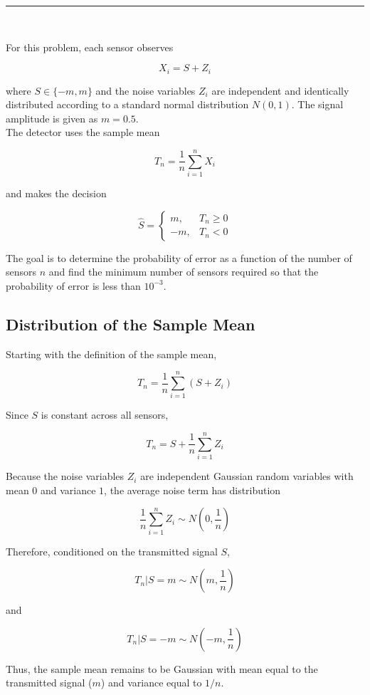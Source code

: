 \documentclass[12pt,a4paper]{article}
\begin{document}
\hrule

\

For this problem, each sensor observes

\[
X_i = S + Z_i
\]

where \(S \in \{-m,m\}\) and the noise variables \(Z_i\) are independent and identically distributed according to a standard normal distribution \(N(0,1)\). The signal amplitude is given as \(m = 0.5\). \\

The detector uses the sample mean

\[
T_n = \frac{1}{n}\sum_{i=1}^{n} X_i
\]

and makes the decision

\[
\hat{S} =
\begin{cases}
m, & T_n \ge 0 \\
-m, & T_n < 0
\end{cases}
\]

The goal is to determine the probability of error as a function of the number of sensors \(n\) and find the minimum number of sensors required so that the probability of error is less than \(10^{-3}\).

\subsection{Distribution of the Sample Mean}

Starting with the definition of the sample mean,

\[
T_n = \frac{1}{n}\sum_{i=1}^{n}(S+Z_i)
\]

Since \(S\) is constant across all sensors,

\[
T_n = S + \frac{1}{n}\sum_{i=1}^{n} Z_i
\]

Because the noise variables \(Z_i\) are independent Gaussian random variables with mean \(0\) and variance \(1\), the average noise term has distribution

\[
\frac{1}{n}\sum_{i=1}^{n} Z_i \sim N\left(0,\frac{1}{n}\right)
\]

Therefore, conditioned on the transmitted signal \(S\),

\[
T_n|S=m \sim N\left(m,\frac{1}{n}\right)
\]

and

\[
T_n|S=-m \sim N\left(-m,\frac{1}{n}\right)
\]

Thus, the sample mean remains to be Gaussian with mean equal to the transmitted signal ($m$) and variance equal to \(1/n\).
\end{document}
